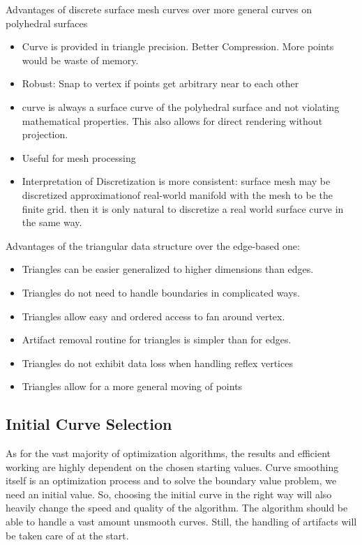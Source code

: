 \documentclass{stdlocal}
\begin{document}
  Advantages of discrete surface mesh curves over more general curves on polyhedral surfaces
  \begin{itemize}
    \item Curve is provided in triangle precision. Better Compression. More points would be waste of memory.
    \item Robust: Snap to vertex if points get arbitrary near to each other
    \item curve is always a surface curve of the polyhedral surface and not violating mathematical properties. This also allows for direct rendering without projection.
    \item Useful for mesh processing
    \item Interpretation of Discretization is more consistent: surface mesh may be discretized approximationof real-world manifold with the mesh to be the finite grid. then it is only natural to discretize a real world surface curve in the same way.
  \end{itemize}

  Advantages of the triangular data structure over the edge-based one:
  \begin{itemize}
    \item Triangles can be easier generalized to higher dimensions than edges.
    \item Triangles do not need to handle boundaries in complicated ways.
    \item Triangles allow easy and ordered access to fan around vertex.
    \item Artifact removal routine for triangles is simpler than for edges.
    \item Triangles do not exhibit data loss when handling reflex vertices
    \item Triangles allow for a more general moving of points
  \end{itemize}

\subsection{Initial Curve Selection} %
\label{sub:initial_curve_selection}
  As for the vast majority of optimization algorithms, the results and efficient working are highly dependent on the chosen starting values.
  Curve smoothing itself is an optimization process and to solve the boundary value problem, we need an initial value.
  So, choosing the initial curve in the right way will also heavily change the speed and quality of the algorithm.
  The algorithm should be able to handle a vast amount unsmooth curves.
  Still, the handling of artifacts will be taken care of at the start.
\end{document}
